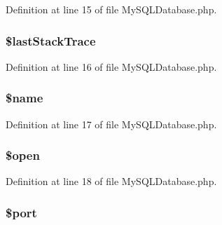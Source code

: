 Definition at line 15 of file My\+S\+Q\+L\+Database.\+php.

\hypertarget{class_my_s_q_l_database_a12ff8f78a47e0fa691355a485c2e696a}{}
\subsubsection[{\$last\+Stack\+Trace}]{\setlength{\rightskip}{0pt plus 5cm}\$last\+Stack\+Trace\hspace{0.3cm}{\ttfamily [protected]}}\label{class_my_s_q_l_database_a12ff8f78a47e0fa691355a485c2e696a}


Definition at line 16 of file My\+S\+Q\+L\+Database.\+php.

\hypertarget{class_my_s_q_l_database_ab2fc40d43824ea3e1ce5d86dee0d763b}{}
\subsubsection[{\$name}]{\setlength{\rightskip}{0pt plus 5cm}\$name\hspace{0.3cm}{\ttfamily [protected]}}\label{class_my_s_q_l_database_ab2fc40d43824ea3e1ce5d86dee0d763b}


Definition at line 17 of file My\+S\+Q\+L\+Database.\+php.

\hypertarget{class_my_s_q_l_database_a4269f690c0554ecb1deec21b80f321dc}{}
\subsubsection[{\$open}]{\setlength{\rightskip}{0pt plus 5cm}\$open\hspace{0.3cm}{\ttfamily [protected]}}\label{class_my_s_q_l_database_a4269f690c0554ecb1deec21b80f321dc}


Definition at line 18 of file My\+S\+Q\+L\+Database.\+php.

\hypertarget{class_my_s_q_l_database_aa0787efab4b22e8a212882f3409d4c77}{}
\subsubsection[{\$port}]{\setlength{\rightskip}{0pt plus 5cm}\$port\hspace{0.3cm}{\ttfamily [protected]}}\label{class_my_s_q_l_database_aa0787efab4b22e8a212882f3409d4c77}


